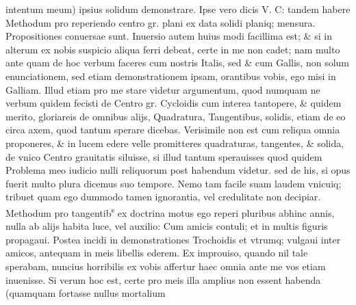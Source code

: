 \documentclass[11pt,a4paper]{article}
\begin{document}

intentum meum) ipsius solidum demonstrare. Ipse vero dicis V. C: tandem habere Methodum pro reperiendo centro gr. plani ex data solidi planiq; mensura. Propositiones conuersae sunt. Inuersio autem huius modi facillima est; \& si in alterum ex nobis suspicio aliqua ferri debeat, certe in me non cadet; nam multo ante quam de hoc verbum faceres cum nostris Italis, sed \& cum Gallis, non solum enunciationem, sed etiam demonstrationem ipsam, orantibus vobis, ego misi in Galliam. Illud etiam pro me stare videtur argumentum, quod numquam ne verbum quidem fecisti de Centro gr. Cycloidis cum interea tantopere, \& quidem merito, gloriareis de omnibus alijs, Quadratura, Tangentibus, solidis, etiam de eo circa axem, quod tantum sperare dicebas. Verisimile non est cum reliqua omnia proponeres, \& in lucem edere velle promitteres quadraturas, tangentes, \& solida, de vnico Centro grauitatis siluisse, si illud tantum sperauisses quod quidem Problema meo iudicio nulli reliquorum post habendum videtur. sed de his, si opus fuerit multo plura dicemus suo tempore. Nemo tam facile suam laudem vnicuiq; tribuet quam ego dummodo tamen ignorantia, vel credulitate non decipiar. Methodum pro tangentib\textsuperscript{s} ex doctrina motus ego reperi pluribus abhinc annis, nulla ab alijs habita luce, vel auxilio: Cum amicis contuli; et in multis figuris propagaui. Postea incidi in demonstrationes Trochoidis et vtrumq; vulgaui inter amicos, antequam in meis libellis ederem. Ex improuiso, quando nil tale sperabam, nuncius horribilis ex vobis affertur haec omnia ante me vos etiam inuenisse. Si verum hoc est, certe pro meis illa amplius non essent habenda (quamquam fortasse nullus mortalium
\end{document}
